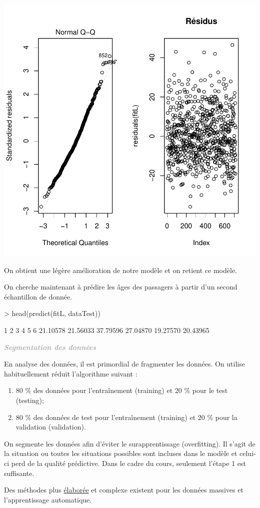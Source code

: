 \documentclass[11pt,french]{report}
\newenvironment{moreInfo}[1]
	{\begin{mdframed}
	\textcolor{darkgray}{\huge \raisebox{-3.5pt}{\faInfo} 
	\hspace{0.5cm} \large\bfseries #1}\\[5pt]
	\normalsize
	\makebox[0.1\textwidth][l]{}	
	\begin{minipage}{10cm}}
	{	\end{minipage}
	\end{mdframed}}
\begin{document}
\includegraphics{notes_de_cours-043}

On obtient une légère amélioration de notre modèle et on retient ce modèle. \newline

On cherche maintenant à prédire les âges des passagers à partir d'un second échantillon de donnée.

\begin{Schunk}
\begin{Sinput}
> head(predict(fitL, dataTest))
\end{Sinput}
\begin{Soutput}
       1        2        3        4        5        6 
21.10578 21.56033 37.79596 27.04870 19.27570 20.43965 
\end{Soutput}
\end{Schunk}

\begin{moreInfo}{\emph{Segmentation des données}}
      En analyse des données, il est primordial de fragmenter les données. On utilise habituellement réduit l'algorithme suivant :
      \begin{enumerate}
      \item 80 \% des données pour l'entraînement (training) et 20 \% pour le test (testing);
      \item 80 \% des données de test pour l'entraînement  (training) et 20 \% pour la validation (validation). 
      \end{enumerate}
      On segmente les données afin d'éviter le surapprentissage (overfitting). Il s'agit de la situation ou toutes les situations possibles sont incluses dans le modèle et celui-ci perd de la qualité prédictive. 
      Dans le cadre du cours, seulement l'étape 1 est suffisante. \newline
      
      Des méthodes plus \href{https://fr.wikipedia.org/wiki/Validation_croisée}{élaborée} et complexe existent pour les données massives et l'apprentissage automatique.
\end{moreInfo}
\end{document}
